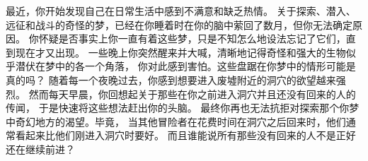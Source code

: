 \documentclass[a4paper, 10pt]{article}
\begin{document}
最近，你开始发现自己在日常生活中感到不满意和缺乏热情。
关于探索、潜入、远征和战斗的奇怪的梦，已经在你睡着时在你的脑中萦回了数月，但你无法确定原因。
你怀疑是否事实上你一直有着这些梦，只是不知怎么地设法忘记了它们，直到现在才又出现。
一些晚上你突然醒来并大喊，清晰地记得奇怪和强大的生物似乎潜伏在梦中\zhTransDungeon{}的各一个角落，
你对此感到害怕。这些盘踞在你梦中的情形可能是真的吗？
随着每一个夜晚过去，你感到想要进入废墟附近的洞穴的欲望越来强烈。
然而每天早晨，你回想起关于那些在你之前进入洞穴并且还没有回来的人的传闻，
于是快速将这些想法赶出你的头脑。
最终你再也无法抗拒对探索那个你梦中奇幻地方的渴望。毕竟，
当其他冒险者在花费时间在洞穴之后回来时，他们通常看起来比他们刚进入洞穴时要好。
而且谁能说所有那些没有回来的人不是正好还在继续前进？
\end{document}
